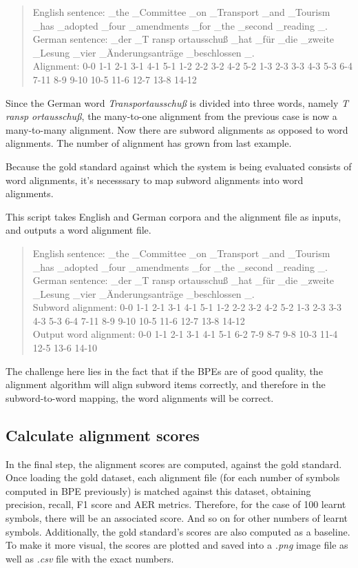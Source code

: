 \begin{quote}
	English sentence: \_the \_Committee \_on \_Transport \_and \_Tourism \_has \_adopted \_four \_amendments \_for \_the \_second \_reading \_.\\
	German sentence: \_der \_T ransp ortausschuß \_hat \_für \_die \_zweite \_Lesung \_vier \_Änderungsanträge \_beschlossen \_.\\
	Alignment: 0-0 1-1 2-1 3-1 4-1 5-1 1-2 2-2 3-2 4-2 5-2 1-3 2-3 3-3 4-3 5-3 6-4 7-11 8-9 9-10 10-5 11-6 12-7 13-8 14-12
\end{quote}

Since the German word \emph{Transportausschuß} is divided into three words, namely \emph{T ransp ortausschuß}, the many-to-one alignment from the previous case is now a many-to-many alignment. Now there are subword alignments as opposed to word alignments. The number of alignment has grown from last example.

Because the gold standard against which the system is being evaluated consists of word alignments, it's necesssary to map subword alignments into word alignments.

This script takes English and German corpora and the alignment file as inputs, and outputs a word alignment file.

\begin{quote}
	English sentence: \_the \_Committee \_on \_Transport \_and \_Tourism \_has \_adopted \_four \_amendments \_for \_the \_second \_reading \_.\\
	German sentence: \_der \_T ransp ortausschuß \_hat \_für \_die \_zweite \_Lesung \_vier \_Änderungsanträge \_beschlossen \_.\\
	Subword alignment: 0-0 1-1 2-1 3-1 4-1 5-1 1-2 2-2 3-2 4-2 5-2 1-3 2-3 3-3 4-3 5-3 6-4 7-11 8-9 9-10 10-5 11-6 12-7 13-8 14-12\\
	Output word alignment: 0-0 1-1 2-1 3-1 4-1 5-1 6-2 7-9 8-7 9-8 10-3 11-4 12-5 13-6 14-10
\end{quote}

The challenge here lies in the fact that if the BPEs are of good quality, the alignment algorithm will align subword items correctly, and therefore in the subword-to-word mapping, the word alignments will be correct.

\subsection{Calculate alignment scores}

In the final step, the alignment scores are computed, against the gold standard. Once loading the gold dataset, each alignment file (for each number of symbols computed in BPE previously) is matched against this dataset, obtaining precision, recall, F1 score and AER metrics. Therefore, for the case of 100 learnt symbols, there will be an associated score. And so on for other numbers of learnt symbols. Additionally, the gold standard's scores are also computed as a baseline. To make it more visual, the scores are plotted and saved into a \emph{.png} image file as well as \emph{.csv} file with the exact numbers.

